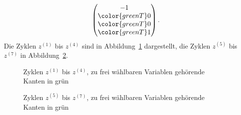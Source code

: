 \begin{loesung}
\[\begin{pmatrix}
             -1\\
\color{greenT} 0\\
\color{greenT} 0\\
\color{greenT} 1
\end{pmatrix}.
\]
Die Zyklen $z^{(1)}$ bis $z^{(4)}$ sind in Abbildung~\ref{10000028:z1bisz4}
dargestellt, die Zyklen $z^{(5)}$ bis $z^{(7)}$ in Abbildung~\ref{10000028:z5bisz7}.
\begin{figure}
\centering
{}
\caption{Zyklen $z^{(1)}$ bis $z^{(4)}$, zu frei wählbaren Variablen
gehörende Kanten in grün
\label{10000028:z1bisz4}}
\end{figure}
\begin{figure}
\centering
{}
\caption{Zyklen $z^{(5)}$ bis $z^{(7)}$, zu frei wählbaren Variablen
gehörende Kanten in grün
\label{10000028:z5bisz7}}
\end{figure}

\end{loesung}
